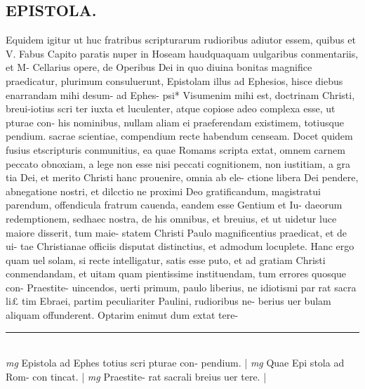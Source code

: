 \documentclass{article}
\begin{document}
\begin{pages}
\section*{EPISTOLA. }\pstart Equidem igitur ut huc fratribus scripturarum rudioribus   adiutor essem, quibus et V. Fabus  Capito paratis nuper in Hoseam haudquaquam uulgaribus conmentariis, et M- Cellarius opere, de Operibus Dei in quo diuina bonitas magnifice praedicatur, plurimum consuluerunt, Epistolam illus ad Ephesios, hisce diebus enarrandam mihi desum- ad Ephes- psi* Visumenim mihi est, doctrinam Christi, breui-iotius scri ter iuxta et luculenter, atque copiose adeo complexa esse, ut pturae con- his nominibus, nullam aliam ei praeferendam existimem, totiusque pendium. sacrae scientiae, compendium recte habendum censeam.  \pend\pstart Docet quidem fusius etscripturis conmunitius, ea quae Romams scripta extat, omnem carnem peccato obnoxiam, a lege non esse nisi peccati cognitionem, non iustitiam, a gra tia Dei, et merito Christi hanc prouenire, omnia ab ele- ctione libera Dei pendere, abnegatione nostri, et dilcctio ne proximi Deo gratificandum, magistratui parendum, offendicula fratrum cauenda, eandem esse Gentium et Iu- daeorum redemptionem, sedhaec nostra, de his omnibus, et breuius, et ut uidetur luce maiore disserit, tum maie- statem Christi Paulo magnificentius praedicat, et de ui- tae Christianae officiis disputat distinctius, et admodum locuplete.  \pend\pstart Hanc ergo quam uel solam, si recte intelligatur, satis esse puto, et ad gratiam Christi conmendandam, et uitam quam pientissime instituendam, tum errores quosque con- Praestite- uincendos, uerti primum, paulo liberius, ne idiotismi par rat sacra li£ tim Ebraei, partim peculiariter Paulini, rudioribus ne- berius uer bulam aliquam offunderent. Optarim enimut dum extat tere-  \pend
\vspace{0.5cm}\noindent
\vspace{0.2cm}\rule{1cm}{0.2pt}\\ 
\hspace{0.2cm}\textit{mg}
\footnotesize Epistola ad Ephes totius scri pturae con- pendium.  
\normalsize| 
\hspace{0.2cm}\textit{mg}
\footnotesize Quae Epi stola ad Rom- con tincat. 
\normalsize| 
\hspace{0.2cm}\textit{mg}
\footnotesize Praestite- rat sacrali breius uer tere.  
\normalsize| 

\end{pages}
\end{document}
